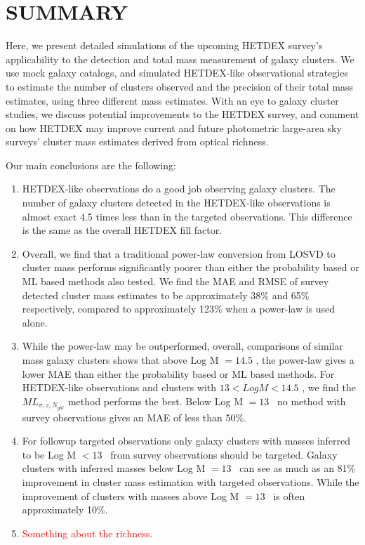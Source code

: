 \documentclass[fleqn,usenatbib]{mnras}
\newcommand{\editorial}[1]{\textcolor{red}{#1}}
\begin{document}
\section{SUMMARY}\label{sec:summary}
Here, we present detailed simulations of the upcoming HETDEX survey's applicability to the detection and total mass measurement of galaxy clusters. We use mock galaxy catalogs, and simulated HETDEX-like observational strategies to estimate the number of clusters observed and the precision of their total mass estimates, using three different mass estimates. With an eye to galaxy cluster studies, we discuss potential improvements to the HETDEX survey, and comment on how HETDEX may improve current and future photometric large-area sky surveys' cluster mass estimates derived from optical richness.

Our main conclusions are the following:
\begin{enumerate}
	\item HETDEX-like observations do a good job observing galaxy clusters. The number of galaxy clusters detected in the HETDEX-like observations is almost exact 4.5 times less than in the targeted observations. This difference is the same as the overall HETDEX fill factor.
	\item Overall, we find that a traditional power-law conversion from LOSVD to cluster mass performs significantly poorer than either the probability based or ML based methods also tested. We find the MAE and RMSE of survey detected cluster mass estimates to be approximately 38\% and 65\% respectively, compared to approximately 123\% when a power-law is used alone.
	\item While the power-law may be outperformed, overall, comparisons of similar mass galaxy clusters shows that above Log M $=14.5$ \Msol, the power-law gives a lower MAE than either the probability based or ML based methods. For HETDEX-like observations and clusters with $13 < Log M <14.5$ \Msol, we find the $ML_{\sigma, z, N_{gal}}$ method performs the best. Below Log M $=13$ \Msol\ no method with survey observations gives an MAE of less than 50\%.
	\item For followup targeted observations only galaxy clusters with masses inferred to be Log M $<13$ \Msol\ from survey observations should be targeted. Galaxy clusters with inferred masses below Log M $=13$ \Msol\ can see as much as an 81\% improvement in cluster mass estimation with targeted observations. While the improvement of clusters with masses above Log M $=13$ \Msol\ is often approximately 10\%.
	\item \editorial{Something about the richness.}
\end{enumerate}
\end{document}

